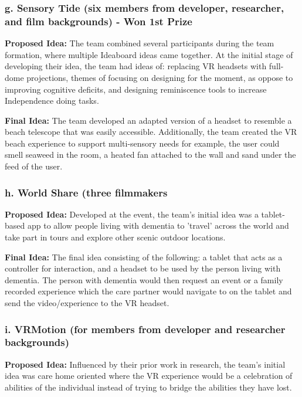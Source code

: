 \subsubsection{g. Sensory Tide (six members from developer, researcher, and film backgrounds) - Won 1st Prize}
\label{sec:senosryTide}

\textbf{Proposed Idea:} The team combined several participants during the team formation, where multiple Ideaboard ideas came together. At the initial stage of developing their idea, the team had ideas of: replacing VR headsets with full-dome projections, themes of focusing on designing for the moment, as oppose to improving cognitive deficits, and designing reminiscence tools to increase Independence doing tasks.

\textbf{Final Idea:} The team developed an adapted version of a headset to resemble a beach telescope that was easily accessible. Additionally, the team created the VR beach experience to support multi-sensory needs for example, the user could smell seaweed in the room, a heated fan attached to the wall and sand under the feed of the user. 

\subsubsection{h. World Share (three filmmakers}
\label{sec:WorldShare}

\textbf{Proposed Idea:} Developed at the event, the team's initial idea was a tablet-based app to allow people living with dementia to 'travel' across the world and take part in tours and explore other scenic outdoor locations.

\textbf{Final Idea:} The final idea consisting of the following: a tablet that acts as a controller for interaction, and a headset to be used by the person living with dementia. The person with dementia would then request an event or a family recorded experience which the care partner would navigate to on the tablet and send the video/experience to the VR headset.

\subsubsection{i. VRMotion (for members from developer and researcher backgrounds)}
\label{VRMotion}
\textbf{Proposed Idea:} Influenced by their prior work in research, the team's initial idea was care home oriented where the VR experience would be a celebration of abilities of the individual instead of trying to bridge the abilities they have lost. 

